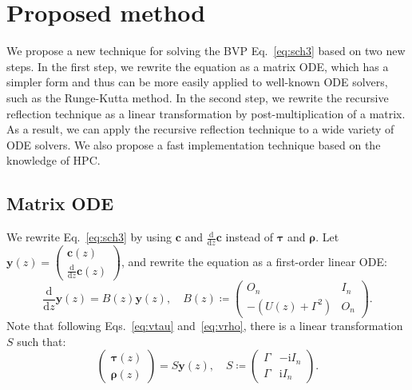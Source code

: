 \documentclass[preprint, 5p, times, sort&compress]{elsarticle}
\def\vecc{\bm{c}}
\def\vecy{\bm{y}}
\def\vtau{\bm{\tau}}
\def\vrho{\bm{\rho}}
\def\dd{\mathrm{d}}
\def\imag{\mathrm{i}}
\begin{document}
        \section{Proposed method}
        We propose a new technique for solving the BVP Eq.~\eqref{eq:sch3} based on two new steps.
        In the first step, we rewrite the equation as a matrix ODE, which has a simpler form and thus can be more easily applied to well-known ODE solvers, such as the Runge-Kutta method.
        In the second step, we rewrite the recursive reflection technique as a linear transformation by post-multiplication of a matrix.
        As a result, we can apply the recursive reflection technique to a wide variety of ODE solvers.
        We also propose a fast implementation technique based on the knowledge of HPC.

        \subsection{Matrix ODE}
        We rewrite Eq.~\eqref{eq:sch3} by using $\vecc$ and $\frac{\dd}{\dd z}\vecc$ instead of $\vtau$ and $\vrho$.
        Let $\vecy(z) = \begin{pmatrix}
                        \vecc(z) \\
                        \frac{\dd}{\dd z}\vecc(z)
                \end{pmatrix}$,
        and rewrite the equation as a first-order linear ODE:
        \begin{equation}
                \frac{\dd}{\dd z} \vecy(z) = B(z)\vecy(z),\quad
                B(z) \coloneqq \begin{pmatrix}
                        O_n & I_n \\
                        -\left(U(z)+\Gamma^2\right) & O_n
                \end{pmatrix}.
                \label{eq:ode2}
        \end{equation}
        Note that following Eqs.~\eqref{eq:vtau} and~\eqref{eq:vrho}, there is a linear transformation $S$ such that:
        \begin{equation}
                \begin{pmatrix}
                        \vtau(z) \\
                        \vrho(z)
                \end{pmatrix}
                =
                S
                \vecy(z), \quad
                S\coloneqq\begin{pmatrix}
                                \Gamma & -\imag I_n \\
                                \Gamma & \imag I_n
                \end{pmatrix}.
        \end{equation}
\end{document}

